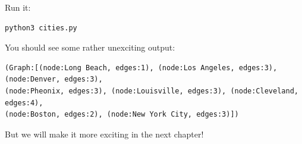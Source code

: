 Run it:
\begin{verbatim}
python3 cities.py
\end{verbatim}

You should see some rather unexciting output:

\begin{verbatim}
(Graph:[(node:Long Beach, edges:1), (node:Los Angeles, edges:3), (node:Denver, edges:3),
(node:Pheonix, edges:3), (node:Louisville, edges:3), (node:Cleveland, edges:4),
(node:Boston, edges:2), (node:New York City, edges:3)])
\end{verbatim}

But we will make it more exciting in the next chapter!
